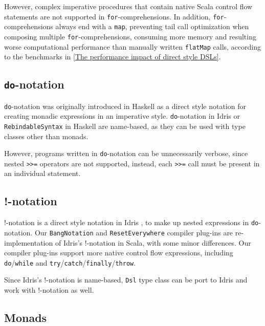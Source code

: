 However, complex imperative procedures that contain native Scala control flow statements are not supported in \lstinline{for}-comprehensions. In addition, \lstinline{for}-comprehensions always end with a \lstinline{map}, preventing tail call optimization when composing multiple \lstinline{for}-comprehensions, consuming more memory and resulting worse computational performance than manually written \lstinline{flatMap} calls, according to the benchmarks in \cref{The performance impact of direct style DSLs}.

\subsection{\lstinline{do}-notation}\label{do-notation}

\lstinline{do}-notation was originally introduced in Haskell \cite{jones1998haskell} as a direct style notation for creating monadic expressions in an imperative style. \lstinline{do}-notation in Idris or \lstinline{RebindableSyntax} in Haskell are name-based, as they can be used with type classes other than monads.

However, programs written in \lstinline{do}-notation can be unnecessarily verbose, since nested \lstinline{>>=} operators are not supported, instead, each \lstinline{>>=} call must be present in an individual statement. 

\subsection{!-notation}

!-notation is a direct style notation in Idris \cite{brady2013idris}, to make up nested expressions in \lstinline{do}-notation. Our \lstinline{BangNotation} and \lstinline{ResetEverywhere} compiler plug-ins are re-implementation of Idris's !-notation in Scala, with some minor differences. Our compiler plug-ins support more native control flow expressions, including \lstinline{do}/\lstinline{while} and \lstinline{try}/\lstinline{catch}/\lstinline{finally}/\lstinline{throw}.

Since Idris's !-notation is name-based, \lstinline{Dsl} type class can be port to Idris and work with !-notation as well.

\subsection{Monads}\label{Monads}

